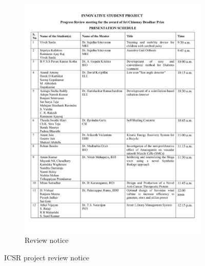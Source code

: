 \documentclass[11pt]{article}
\begin{document}
{\begin{figure}[h]
\begin{subfigure}{.48\textwidth}
    \includegraphics[width=\linewidth]{icsrreview.pdf}
    \caption{Review notice}
\end{subfigure}
\caption{ICSR project review notice}
\label{gauss}
\end{figure}
\FloatBarrier



}
\end{document}
